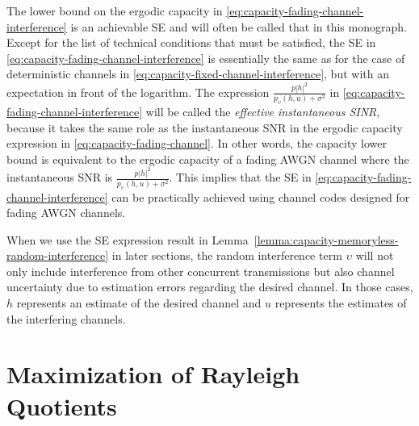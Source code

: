 The lower bound on the ergodic capacity in \eqref{eq:capacity-fading-channel-interference} is an achievable SE and will often be called that in this monograph. Except for the list of technical conditions that must be satisfied, the SE in \eqref{eq:capacity-fading-channel-interference} is essentially the same as for the case of deterministic channels in \eqref{eq:capacity-fixed-channel-interference}, but with an expectation in front of the logarithm.
The expression $\frac{p |h|^2}{p_{\upsilon}(h,u) + \sigma^2}$ in \eqref{eq:capacity-fading-channel-interference} will be called the \emph{effective instantaneous SINR}, because it takes the same role as the instantaneous SNR in the ergodic capacity expression in \eqref{eq:capacity-fading-channel}. In other words, the capacity lower bound is equivalent to the ergodic capacity of a fading \gls{AWGN} channel where the instantaneous SNR is $\frac{p |h|^2}{p_{\upsilon}(h,u) + \sigma^2}$. This implies that the SE in \eqref{eq:capacity-fading-channel-interference} can be practically achieved using channel codes designed for fading \gls{AWGN} channels.


When we use the SE expression result in Lemma~\ref{lemma:capacity-memoryless-random-interference} in later sections, the random interference term $\upsilon$ will not only include interference from other concurrent transmissions but also channel uncertainty due to estimation errors regarding the desired channel. In those cases, $h$ represents an estimate of the desired channel and $u$ represents the estimates of the interfering channels.


\section{Maximization of Rayleigh Quotients}
\label{sec:Rayleigh-quotient}

